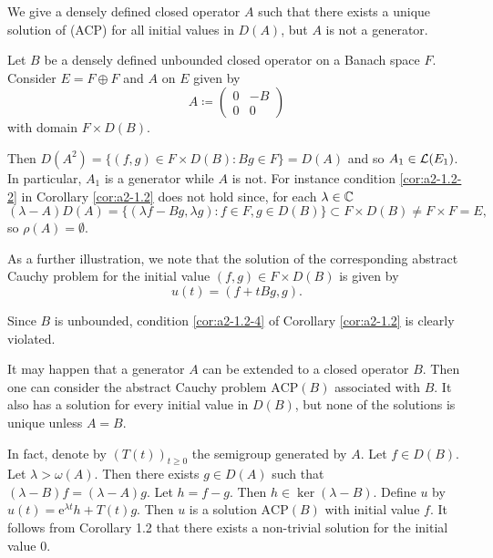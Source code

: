 \begin{example}\label{ex:a2-1.4}
We give a densely defined closed operator $ A $ such that there exists a unique solution of (ACP) for all initial values in $ D(A) $, but $ A $ is not a generator.

Let $ B $ be a densely defined unbounded closed operator on a Banach space $ F $.
Consider $ E = F \oplus F $ and $ A $ on $ E $ given by
\[
    A \coloneqq \begin{pmatrix} 0 & -B \\ 0 & 0 \end{pmatrix}
\]
with domain $ F \times D(B) $.

Then $ D(A^{2}) = \{(f,g) \in F \times D(B) \colon Bg \in F\} = D(A) $ and so $ A_{1} \in \mathcal{L}(E_{1}) $.
In particular, $ A_{1} $ is a generator while
$ A $ is not. For instance
condition \ref{cor:a2-1.2-2}   in Corollary \ref{cor:a2-1.2}   does not hold since, for each $ \lambda \in \mathbb{C} $
\[
    (\lambda-A)D(A) = \{(\lambda f-Bg,\lambda g) \colon f \in F, g \in D(B)\} \subset F \times D(B) \neq F \times F = E ,
\]
so $ \rho(A) = \emptyset $.

As a further illustration, we note that the solution of the corresponding abstract Cauchy problem for the initial value $ (f,g) \in F \times D(B) $ is given by \\
\[
u(t) = (f + tBg,g) .
\] 

Since $ B $ is unbounded, condition \ref{cor:a2-1.2-4}  of Corollary \ref{cor:a2-1.2}  is clearly violated.
\end{example}
\begin{remark*}\label{rem:a2-1.4-kgk} 
It may happen that a generator $A$ can be extended to a closed operator $B$.
Then one can consider the abstract Cauchy problem $\text{ACP}(B)$ associated with $B$.
It also has a solution for every initial value in $D(B)$, but none of the solutions is unique unless $A = B$.

In fact, denote by $(T(t))_{t \geq 0}$ the semigroup generated by $A$.
Let $f \in D(B)$.
Let $\lambda > \omega(A)$.
Then there exists $g \in D(A)$ such that $(\lambda-B)f = (\lambda-A)g$.
Let $h = f - g$.
Then $h \in \ker(\lambda-B)$.
Define $u$ by $u(t) = \mathrm{e}^{\lambda t}h + T(t)g$.
Then $u$ is a solution $\text{ACP}(B)$ with initial value $f$.
It follows from Corollary 1.2 that there exists a non-trivial solution for the initial value $0$.
\end{remark*}

